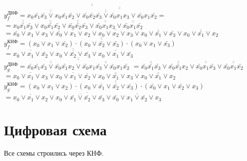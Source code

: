 \documentclass{bmstu}
\begin{document}
	$y^{\text{ДНФ}}_f = \overline{\overline{
			\overline{\overline{
					x_0 \bar{x_1} \bar{x_3} \vee x_0 \bar{x_1} \bar{x_2} 
			}} \vee
			\overline{\overline{
					\overline{\overline{
							\bar{x_0} \bar{x_2} \bar{x_3} \vee \bar{x_0} x_1 x_3 
					}} \vee \bar{x_0} x_1 \bar{x_2}
			}}
	}} =$ \\
	$= \overline{\overline{x_0 \bar{x_1} \bar{x_3}}} \vee \overline{\overline{x_0 \bar{x_1} \bar{x_2}}} \vee \overline{\overline{\bar{x_0} \bar{x_2} \bar{x_3}}} \vee \overline{\overline{\bar{x_0} x_1 x_3}} \vee \overline{\overline{\bar{x_0} x_1 \bar{x_2}}}$ \\
	$= \overline{\bar{x_0} \vee x_1 \vee x_3} \vee \overline{\bar{x_0} \vee x_1 \vee x_2} \vee \overline{x_0 \vee x_2 \vee x_3} \vee \overline{x_0 \vee \bar{x_1} \vee \bar{x_3}} \vee \overline{x_0 \vee \bar{x_1} \vee x_2}$ \\
	$y^{\text{КНФ}}_f = \overline{\overline{(x_0 \vee x_1 \vee \bar{x_2}) \cdot (x_0 \vee \bar{x_2} \vee \bar{x_3}) \cdot (x_0 \vee x_1 \vee \bar{x_3})}}$ \\
	$= \overline{ \overline{x_0 \vee x_1 \vee \bar{x_2}} \vee \overline{x_0 \vee \bar{x_2} \vee \bar{x_3}} \vee \overline{x_0 \vee x_1 \vee \bar{x_3}}}$ \\
	
	$y^{\text{ДНФ}}_g = \overline{\overline{\overline{\overline{\bar{x_0} \bar{x_1} \bar{x_3} \vee \bar{x_0} \bar{x_1} x_2}} \vee \overline{\overline{\bar{x_0} x_1 \bar{x_3} \vee \bar{x_0} x_1 \bar{x_2}}}}}$
	$= \overline{\overline{\bar{x_0} \bar{x_1} \bar{x_3}}} \vee
	\overline{\overline{\bar{x_0} \bar{x_1} x_2}} \vee
	\overline{\overline{\bar{x_0} x_1 \bar{x_3}}} \vee
	\overline{\overline{\bar{x_0} x_1 \bar{x_2}}} $ \\
	$= \overline{x_0 \vee x_1 \vee x_3} \vee \overline{x_0 \vee x_1 \vee \bar{x_2}} \vee \overline{x_0 \vee \bar{x_1} \vee x_3} \vee \overline{x_0 \vee \bar{x_1} \vee x_2}$ \\
	$y^{\text{КНФ}}_g = \overline{\overline{(x_0 \vee x_1 \vee x_2) \cdot (x_0 \vee \bar{x_1} \vee \bar{x_2} \vee \bar{x_3}) \cdot (\bar{x_0} \vee x_1 \vee \bar{x_2} \vee x_3)}}$ \\
	$= \overline{\overline{x_0 \vee x_1 \vee x_2} \vee \overline{x_0 \vee \bar{x_1} \vee \bar{x_2} \vee \bar{x_3}} \vee \overline{\bar{x_0} \vee x_1 \vee \bar{x_2} \vee x_3}}$ \\
	
	\section{Цифровая схема}
	\begin{flushleft}
		Все схемы строились через КНФ.
	\end{flushleft}
	
\end{document}
